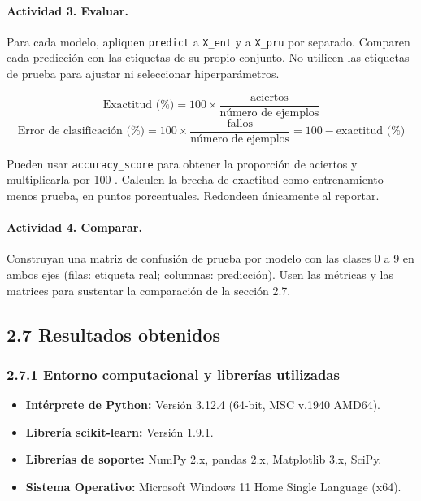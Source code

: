 \documentclass[11pt,a4paper]{article}
\begin{document}
\paragraph{Actividad 3. Evaluar.}
Para cada modelo, apliquen \texttt{predict} a \texttt{X\_ent} y a \texttt{X\_pru} por separado. Comparen cada predicción con las etiquetas de su propio conjunto. No utilicen las etiquetas de prueba para ajustar ni seleccionar hiperparámetros.

\[
\text{Exactitud (\%)} = 100 \times \frac{\text{aciertos}}{\text{número de ejemplos}}
\]
\[
\text{Error de clasificación (\%)} = 100 \times \frac{\text{fallos}}{\text{número de ejemplos}} = 100 - \text{exactitud (\%)}
\]

Pueden usar \texttt{accuracy\_score} para obtener la proporción de aciertos y multiplicarla por 100 \cite{sklearn_accuracy}. Calculen la brecha de exactitud como entrenamiento menos prueba, en puntos porcentuales. Redondeen únicamente al reportar.

\paragraph{Actividad 4. Comparar.}
Construyan una matriz de confusión de prueba por modelo con las clases 0 a 9 en ambos ejes (filas: etiqueta real; columnas: predicción). Usen las métricas y las matrices para sustentar la comparación de la sección 2.7.

\vspace{0.4cm}

\subsection*{2.7 Resultados obtenidos}

\subsubsection*{2.7.1 Entorno computacional y librerías utilizadas}
\begin{itemize}[leftmargin=*,noitemsep]
    \item \textbf{Intérprete de Python:} Versión 3.12.4 (64-bit, MSC v.1940 AMD64).
    \item \textbf{Librería scikit-learn:} Versión 1.9.1.
    \item \textbf{Librerías de soporte:} NumPy 2.x, pandas 2.x, Matplotlib 3.x, SciPy.
    \item \textbf{Sistema Operativo:} Microsoft Windows 11 Home Single Language (x64).
\end{itemize}
\end{document}
